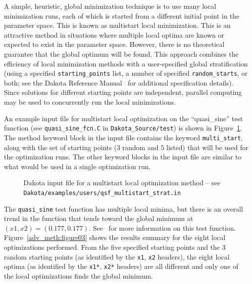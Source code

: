 A simple, heuristic, global minimization technique is to use many
local minimization runs, each of which is started from a different
initial point in the parameter space. This is known as multistart
local minimization. This is an attractive method in situations where
multiple local optima are known or expected to exist in the parameter
space. However, there is no theoretical guarantee that the global
optimum will be found. This approach combines the efficiency of local
minimization methods with a user-specified global stratification
(using a specified \texttt{starting\_points} list, a number of
specified \texttt{random\_starts}, or both; see the Dakota Reference
Manual~\cite{RefMan} for additional specification details). Since
solutions for different starting points are independent, parallel
computing may be used to concurrently run the local minimizations.

An example input file for multistart local optimization on the
``quasi\_sine'' test function (see \texttt{quasi\_sine\_fcn.C} in
\texttt{Dakota\_Source/test}) is shown in Figure~\ref{adv_meth:figure02}. 
The method keyword block in the input file contains the keyword
\texttt{multi\_start}, along with the set of starting points (3 random 
and 5 listed) that will be used for the optimization runs. The other
keyword blocks in the input file are similar to what would be used in
a single optimization run.

\begin{figure}
  \centering
  \begin{bigbox}
    \begin{small}
    \end{small}
  \end{bigbox}
  \caption{Dakota input file for a multistart local optimization method --
see \texttt{Dakota/examples/users/qsf\_multistart\_strat.in} }
  \label{adv_meth:figure02}
\end{figure}

The \texttt{quasi\_sine} test function has multiple local minima, but
there is an overall trend in the function that tends toward the global
minimum at $(x1,x2)=(0.177,0.177)$. See~\cite{Giu00} for more
information on this test function. Figure~\ref{adv_meth:figure03} shows
the results summary for the eight local optimizations performed. From
the five specified starting points and the 3 random starting points
(as identified by the \texttt{x1}, \texttt{x2} headers), the eight
local optima (as identified by the \texttt{x1*},
\texttt{x2*} headers) are all different and only one of the local
optimizations finds the global minimum.

